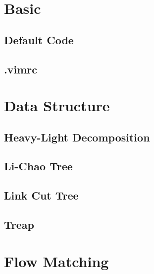 \documentclass{article}
\begin{document}
\setlength\parindent{0pt}
\setlength\columnseprule{0.5pt}
\footnotesize


\pagestyle{fancy}
\fancyfoot{}
\fancyhead[R]{\thepage}

\twocolumn

\tableofcontents

\section{Basic}

\subsection{Default Code}


\subsection{.vimrc}


\section{Data Structure}

\subsection{Heavy-Light Decomposition}


\subsection{Li-Chao Tree}


\subsection{Link Cut Tree}


\subsection{Treap}


\section{Flow Matching}
\end{document}
